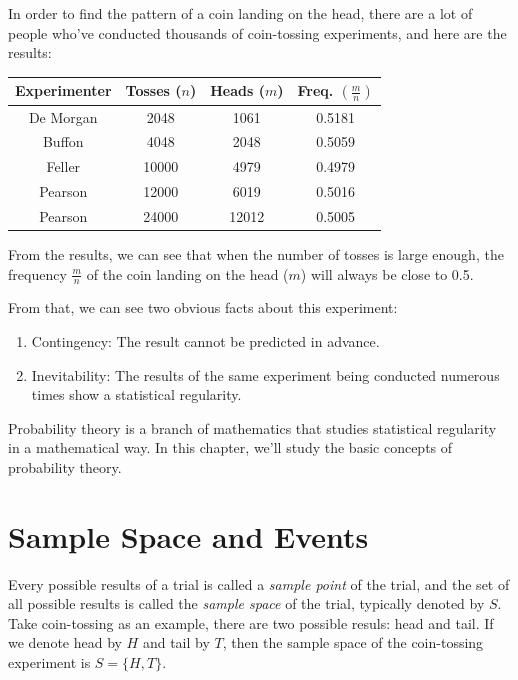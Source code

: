 \documentclass{report}
\begin{document}
\begin{multicols}{2}
  In order to find the pattern of a coin landing on the head, there are a lot of
  people who've conducted thousands of coin-tossing experiments, and here are the
  results:

  \begin{center}
    \begin{tabular}{|c|c|c|c|}
      \hline
      Experimenter & Tosses ($n$) & Heads ($m$) & Freq. $\left(\frac{m}{n}\right)$ \\
      \hline
      De Morgan    & 2048         & 1061        & 0.5181                           \\
      Buffon       & 4048         & 2048        & 0.5059                           \\
      Feller       & 10000        & 4979        & 0.4979                           \\
      Pearson      & 12000        & 6019        & 0.5016                           \\
      Pearson      & 24000        & 12012       & 0.5005                           \\
      \hline
    \end{tabular}
  \end{center}

  From the results, we can see that when the number of tosses is large enough,
  the frequency $\frac{m}{n}$ of the coin landing on the head ($m$) will always
  be close to 0.5.

  From that, we can see two obvious facts about this experiment:
  \begin{enumerate}
    \item Contingency: The result cannot be predicted in advance.
    \item Inevitability: The results of the same experiment being conducted numerous
          times show a statistical regularity.
  \end{enumerate}

  Probability theory is a branch of mathematics that studies statistical
  regularity in a mathematical way. In this chapter, we'll study the basic
  concepts of probability theory.

  \section{Sample Space and Events}

  Every possible results of a trial is called a \emph{sample point} of the trial,
  and the set of all possible results is called the \emph{sample space} of the
  trial, typically denoted by $S$. Take coin-tossing as an example, there are two
  possible resuls: head and tail. If we denote head by $H$ and tail by $T$, then
  the sample space of the coin-tossing experiment is $S = \{H, T\}$.


\end{multicols}
\end{document}
